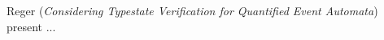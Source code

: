 

Reger
\cite{isola-2016-reger}
({\em Considering Typestate Verification for Quantified 
Event Automata})
present ...
